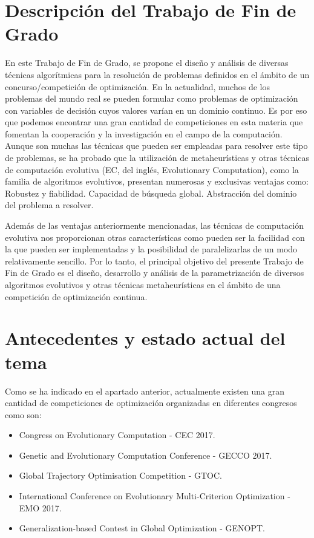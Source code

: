 
\section{Descripción del Trabajo de Fin de Grado}
\label{sec:DESCRIPTION}

En este Trabajo de Fin de Grado, se propone el diseño y análisis de diversas técnicas algorítmicas para la resolución de problemas definidos en el ámbito de un concurso/competición de optimización.
	En la actualidad,  muchos de los problemas del mundo real se pueden formular como problemas de optimización con variables de decisión cuyos valores varían en un dominio continuo. Es por eso que podemos encontrar una gran cantidad de competiciones en esta materia que fomentan la cooperación y la investigación en el campo de la computación. Aunque son muchas las técnicas que pueden ser empleadas para resolver este tipo de problemas, se ha probado que la utilización de metaheurísticas y otras técnicas de computación evolutiva (EC, del inglés, Evolutionary Computation), como la familia de algoritmos evolutivos, presentan numerosas y exclusivas ventajas como:
Robustez y fiabilidad.
Capacidad de búsqueda global.
Abstracción del dominio del problema a resolver.

Además de las ventajas anteriormente mencionadas, las técnicas de computación evolutiva nos proporcionan otras características como pueden ser la facilidad con la que pueden ser implementadas y la posibilidad de paralelizarlas de un modo relativamente sencillo.
	Por lo tanto, el principal objetivo del presente Trabajo de Fin de Grado es el diseño, desarrollo y análisis de la parametrización de diversos algoritmos evolutivos y otras técnicas metaheurísticas en el ámbito de una competición de optimización continua. 
\section{Antecedentes y estado actual del tema}
\label{sec:SUBJECT}

Como se ha indicado en el apartado anterior, actualmente existen una gran cantidad de competiciones de optimización organizadas en diferentes congresos como son:
\begin{itemize}
  \item Congress on Evolutionary Computation - CEC 2017.
  \item Genetic and Evolutionary Computation Conference - GECCO 2017.
  \item Global Trajectory Optimisation Competition - GTOC.
  \item International Conference on Evolutionary Multi-Criterion Optimization - EMO 2017.
  \item Generalization-based Contest in Global Optimization - GENOPT.
\end{itemize}

